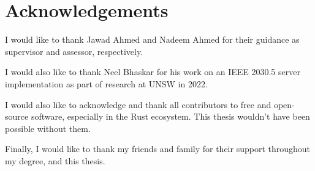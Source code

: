 \chapter*{Acknowledgements}\label{Acknowledgements}
I would like to thank Jawad Ahmed and Nadeem Ahmed for their guidance as supervisor and assessor, respectively.

I would also like to thank Neel Bhaskar for his work on an IEEE 2030.5 server implementation as part of research at UNSW in 2022.

I would also like to acknowledge and thank all contributors to free and open-source software, especially in the Rust ecosystem. This thesis wouldn't have been possible without them.

Finally, I would like to thank my friends and family for their support throughout my degree, and this thesis.
